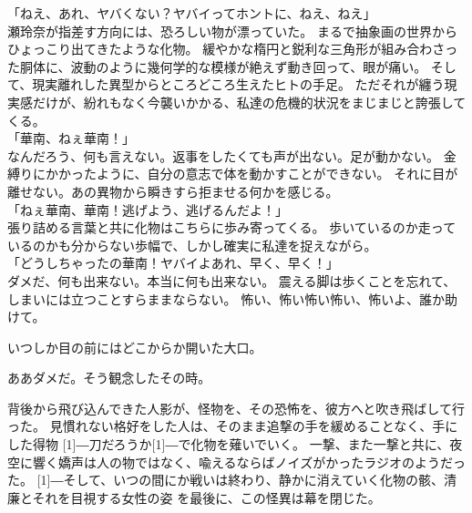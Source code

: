 \documentclass[../IHMain]{subfiles}
\begin{document}
「ねえ、あれ、ヤバくない？ヤバイってホントに、ねえ、ねえ」\\
瀬玲奈が指差す方向には、恐ろしい物が漂っていた。
まるで抽象画の世界からひょっこり出てきたような化物。
緩やかな楕円と鋭利な三角形が組み合わさった胴体に、波動のように幾何学的な模様が絶えず動き回って、眼が痛い。
そして、現実離れした異型からところどころ生えたヒトの手足。
ただそれが纏う現実感だけが、紛れもなく今襲いかかる、私達の危機的状況をまじまじと誇張してくる。\\
「華南、ねぇ華南！」\\
なんだろう、何も言えない。返事をしたくても声が出ない。足が動かない。
金縛りにかかったように、自分の意志で体を動かすことができない。
それに目が離せない。あの異物から瞬きすら拒ませる何かを感じる。\\
「ねぇ華南、華南！逃げよう、逃げるんだよ！」\\
張り詰める言葉と共に化物はこちらに歩み寄ってくる。
歩いているのか走っているのかも分からない歩幅で、しかし確実に私達を捉えながら。\\
「どうしちゃったの華南！ヤバイよあれ、早く、早く！」\\
ダメだ、何も出来ない。本当に何も出来ない。
震える脚は歩くことを忘れて、しまいには立つことすらままならない。
怖い、怖い怖い怖い、怖いよ、誰か助けて。

いつしか目の前にはどこからか開いた大口。

ああダメだ。そう観念したその時。

背後から飛び込んできた人影が、怪物を、その恐怖を、彼方へと吹き飛ばして行った。
見慣れない格好をした人は、そのまま追撃の手を緩めることなく、手にした得物
\scalebox{3}[1]{―}刀だろうか\scalebox{3}[1]{―}で化物を薙いでいく。
一撃、また一撃と共に、夜空に響く嬌声は人の物ではなく、喩えるならばノイズがかったラジオのようだった。
\scalebox{3}[1]{―}そして、いつの間にか戦いは終わり、静かに消えていく化物の骸、清廉とそれを目視する女性の姿
を最後に、この怪異は幕を閉じた。
\end{document}
